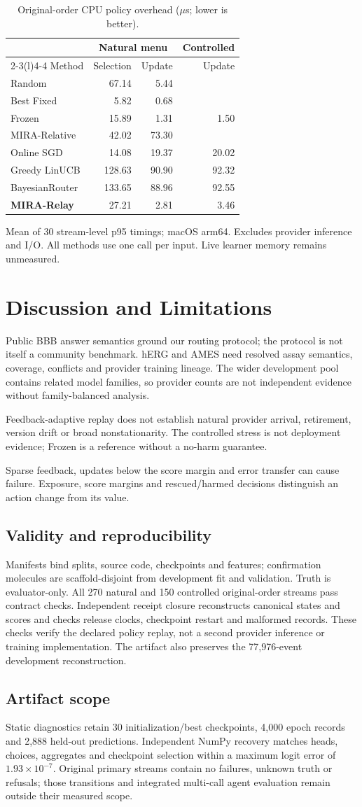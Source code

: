 \documentclass[sigconf,anonymous]{aamas}
\makeatletter
\newcommand{\MiraTableFont}{\fontsize{9}{11}\selectfont}
\newcommand{\tnote}[1]{{\fontsize{8.5}{10}\selectfont\raggedright\par\vspace{3pt}#1\par}}
\newcommand{\notrun}{\textemdash}
\newcommand{\MiraCostCaption}{Original-order CPU policy overhead ($\mu$s; lower is better).}
\newcommand{\MiraCostLabels}{\label{tab:cost-validity}}
\newcommand{\MiraCostBody}{%
\begingroup\centering\MiraTableFont\setlength{\tabcolsep}{4pt}\renewcommand{\arraystretch}{1.08}
\begin{tabular}{@{}lrrr@{}}
\toprule
& \multicolumn{2}{c}{Natural menu} & Controlled \\
\cmidrule(lr){2-3}\cmidrule(l){4-4}
Method & Selection & Update & Update \\
\midrule
Random & 67.14 & 5.44 & \notrun \\
Best Fixed & 5.82 & 0.68 & \notrun \\
Frozen & 15.89 & 1.31 & 1.50 \\
MIRA-Relative & 42.02 & 73.30 & \notrun \\
\midrule
Online SGD & 14.08 & 19.37 & 20.02 \\
Greedy LinUCB & 128.63 & 90.90 & 92.32 \\
BayesianRouter & 133.65 & 88.96 & 92.55 \\
\midrule
\textbf{MIRA-Relay} & 27.21 & 2.81 & 3.46 \\
\bottomrule
\end{tabular}\par
\tnote{Mean of 30 stream-level p95 timings; macOS arm64. Excludes provider inference and I/O. All methods use one call per input. Live learner memory remains unmeasured.}
\endgroup}
\makeatother
\begin{document}
\begin{table}[t]
\caption{\MiraCostCaption}
\MiraCostLabels
\MiraCostBody
\end{table}

\section{Discussion and Limitations}
Public BBB answer semantics ground our routing protocol; the protocol is not itself a community benchmark. hERG and AMES need resolved assay semantics, coverage, conflicts and provider training lineage. The wider development pool contains related model families, so provider counts are not independent evidence without family-balanced analysis.

Feedback-adaptive replay does not establish natural provider arrival, retirement, version drift or broad nonstationarity. The controlled stress is not deployment evidence; Frozen is a reference without a no-harm guarantee.

Sparse feedback, updates below the score margin and error transfer can cause failure. Exposure, score margins and rescued/harmed decisions distinguish an action change from its value.

\subsection{Validity and reproducibility}
Manifests bind splits, source code, checkpoints and features; confirmation molecules are scaffold-disjoint from development fit and validation. Truth is evaluator-only. All 270 natural and 150 controlled original-order streams pass contract checks. Independent receipt closure reconstructs canonical states and scores and checks release clocks, checkpoint restart and malformed records. These checks verify the declared policy replay, not a second provider inference or training implementation. The artifact also preserves the 77,976-event development reconstruction.

\subsection{Artifact scope}
Static diagnostics retain 30 initialization/best checkpoints, 4,000 epoch records and 2,888 held-out predictions. Independent NumPy recovery matches heads, choices, aggregates and checkpoint selection within a maximum logit error of $1.93\times10^{-7}$. Original primary streams contain no failures, unknown truth or refusals; those transitions and integrated multi-call agent evaluation remain outside their measured scope.
\end{document}
